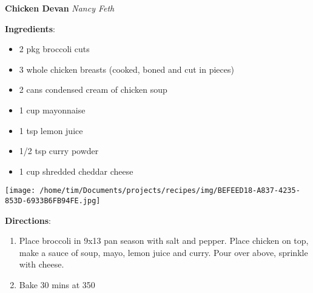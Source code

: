 \documentclass[11pt, twoside, openany]{book}
\begin{document}
\noindent\begin{minipage}[t]{\linewidth}%
{\Large\textbf{Chicken Devan}} \label{chicken-devan}\hfill\textit{Nancy Feth}\\
\noindent\begin{minipage}[t]{0.78\linewidth}%
\textbf{Ingredients}:\vspace{-3mm}
\begin{multicols}{2}
\begin{itemize}\setlength\itemsep{-1mm}
\item 2 pkg broccoli cuts
\item 3 whole chicken breasts (cooked, boned and cut in pieces)
\item 2 cans condensed cream of chicken soup
\item 1 cup mayonnaise
\item 1 tsp lemon juice
\item 1/2 tsp curry powder
\item 1 cup shredded cheddar cheese
\end{itemize}
\end{multicols}
\end{minipage}
\noindent\begin{minipage}[t]{0.18\linewidth}
\centering \strut\vspace*{-\baselineskip}\newline
\texttt{[image: /home/tim/Documents/projects/recipes/img/BEFEED18-A837-4235-853D-6933B6FB94FE.jpg]}\\
\end{minipage}\vspace{3mm}
\textbf{Directions}:
\vspace{-3mm}\begin{enumerate}\setlength\itemsep{-1mm}
\item Place broccoli in 9x13 pan season with salt and pepper. Place chicken on top, make a sauce of soup, mayo, lemon juice and curry. Pour over above, sprinkle with cheese.
\item Bake 30 mins at 350
\end{enumerate}
\end{minipage}\vspace{8mm}
\end{document}
